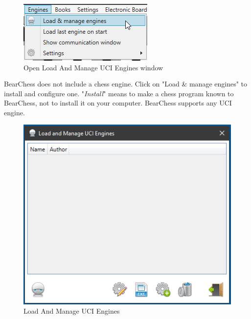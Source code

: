 \documentclass[11pt,a4paper]{article}
\begin{document}
\begin{figure}[H]
	\centering
	\includegraphics[scale=1.0]{LoadEngine.png}
	\caption{Open Load And Manage UCI Engines window}
	\label{fig:LoadEngine}
\end{figure}
BearChess does not include a chess engine. Click on "Load \& manage engines" to install and configure one. "\textit{Install}" means to make a chess program known to BearChess, not to install it on your computer. BearChess supports any UCI engine.\\
\begin{figure}[H]
	\centering
	\includegraphics[scale=1.0]{LoadManageEngine1.png}
	\caption{Load And Manage UCI Engines}
	\label{fig:LoadManageEngine1}
\end{figure}
\end{document}
